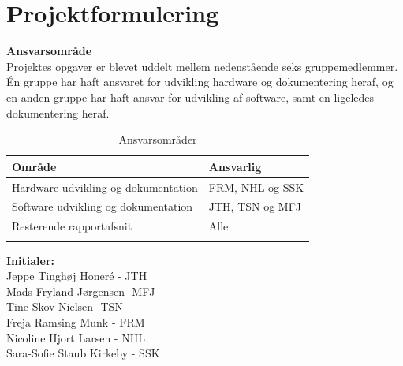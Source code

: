 \chapter{Projektformulering}




\textbf{Ansvarsområde} \\
Projektes opgaver er blevet uddelt mellem nedenstående seks gruppemedlemmer. Én gruppe har haft ansvaret for udvikling hardware og dokumentering heraf, og en anden gruppe har haft ansvar for udvikling af software, samt en ligeledes dokumentering heraf. 



\begin{longtabu} to 
    Område &    Ansvarlig\\[-1ex]
    \midrule
	Hardware udvikling og dokumentation & FRM, NHL og SSK\\
	Software udvikling og dokumentation & JTH, TSN og MFJ \\
	Resterende rapportafsnit & Alle\\
	\caption{Ansvarsområder}
	\label{Ansvar}
\end{longtabu}

\textbf{Initialer: } \\
Jeppe Tinghøj Honeré - JTH \\
Mads Fryland Jørgensen- MFJ \\
Tine Skov Nielsen- TSN \\
Freja Ramsing Munk - FRM \\
Nicoline Hjort Larsen - NHL \\
Sara-Sofie Staub Kirkeby - SSK \\[2ex]

